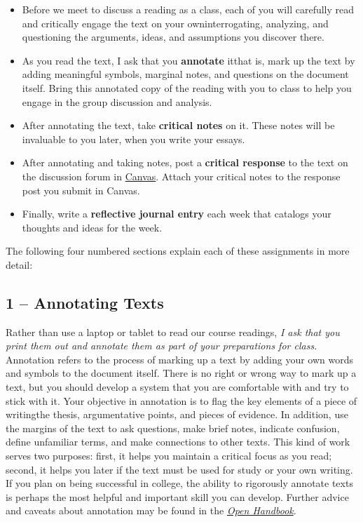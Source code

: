 \documentclass[letterpaper]{article}
\begin{document}
\begin{itemize}

\item Before we meet to discuss a reading as a class, each of you will carefully read and critically engage the text on your own\textemdash interrogating, analyzing, and questioning the arguments, ideas, and assumptions you discover there. 

\item As you read the text, I ask that you \textbf{annotate} it\textemdash that is, mark up the text by adding meaningful symbols, marginal notes, and questions on the document itself. Bring this annotated copy of the reading with you to class to help you engage in the group discussion and analysis. 

\item After annotating the text, take \textbf{critical notes} on it. These notes will be invaluable to you later, when you write your essays. 

\item After annotating and taking notes, post a \textbf{critical response} to the text on the discussion forum in \href{https://canvas.dartmouth.edu}{Canvas}. Attach your critical notes to the response post you submit in Canvas.

\item Finally, write a \textbf{reflective journal entry} each week that catalogs your thoughts and ideas for the week.

\end{itemize}

The following four numbered sections explain each of these assignments in more detail:   

\subsection*{1 -- Annotating Texts}

Rather than use a laptop or tablet to read our course readings, \emph{I ask that you print them out and annotate them as part of your preparations for class}. Annotation refers to the process of marking up a text by adding your own words and symbols to the document itself. There is no right or wrong way to mark up a text, but you should develop a system that you are comfortable with and try to stick with it. Your objective in annotation is to flag the key elements of a piece of writing\textemdash the thesis, argumentative points, and pieces of evidence. In addition, use the margins of the text to ask questions, make brief notes, indicate confusion, define unfamiliar terms, and make connections to other texts. This kind of work serves two purposes: first, it helps you maintain a critical focus as you read; second, it helps you later if the text must be used for study or your own writing. If you plan on being successful in college, the ability to rigorously annotate texts is perhaps the most helpful and important skill you can develop. Further advice and caveats about annotation may be found in the \href{https://github.com/stockphrase/OpenHandbook/raw/master/Open%20Handbook.pdf}{\emph{Open Handbook}}. 
\end{document}
